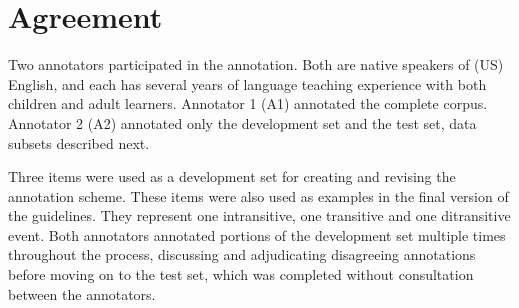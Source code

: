 \section{Agreement}
\label{sec:agreement}
Two annotators participated in the annotation. Both are native speakers of (US) English, and each has several years of language teaching experience with both children and adult learners. Annotator 1 (A1) annotated the complete corpus. Annotator 2 (A2) annotated only the development set and the test set, data subsets described next.

Three items were used as a development set for creating and revising the annotation scheme. These items were also used as examples in the final version of the guidelines. They represent one intransitive, one transitive and one ditransitive event. Both annotators annotated portions of the development set multiple times throughout the process, discussing and adjudicating disagreeing annotations before moving on to the test set, which was completed without consultation between the annotators.

